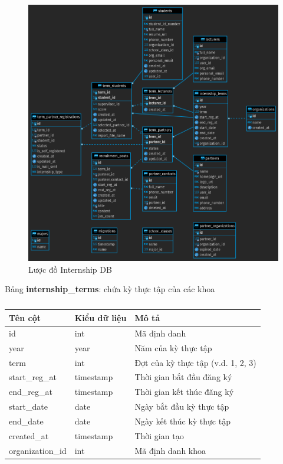 \documentclass[./../main.tex]{subfiles}
\begin{document}
\begin{figure}
	\includegraphics[width=\linewidth]{./images/image1.png}
	\caption{Lược đồ Internship DB}
	\label{fig:internship_db_design}
\end{figure}

Bảng \textbf{internship\_terms}: chứa kỳ thực tập của các khoa

\begin{table}[H]
	\caption{}
	\label{tab:db_terms}
	\begin{tabular}{|l|l|l|}
	\hline
	\textbf{Tên cột} & \textbf{Kiểu dữ liệu} & \textbf{Mô tả}                     \\ \hline
	id               & int                   & Mã định danh                       \\ \hline
	year             & year                  & Năm của kỳ thực tập                \\ \hline
	term             & int                   & Đợt của kỳ thực tập (v.d. 1, 2, 3) \\ \hline
	start\_reg\_at   & timestamp             & Thời gian bắt đầu đăng ký          \\ \hline
	end\_reg\_at     & timestamp             & Thời gian kết thúc đăng ký         \\ \hline
	start\_date      & date                  & Ngày bắt đầu kỳ thực tập           \\ \hline
	end\_date        & date                  & Ngày kết thúc kỳ thực tập          \\ \hline
	created\_at      & timestamp             & Thời gian tạo                      \\ \hline
	organization\_id & int                   & Mã định danh khoa                  \\ \hline
	\end{tabular}
\end{table}
\end{document}
